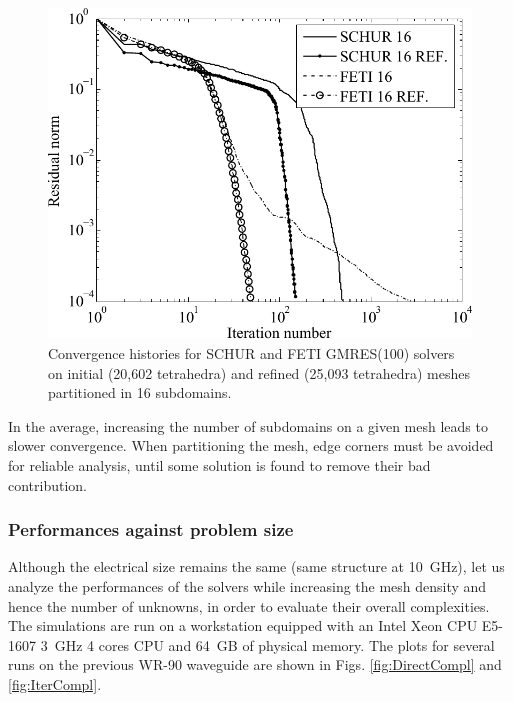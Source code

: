 \begin{figure}[h!]
\centering
\includegraphics[width=13.4cm]{DD16ref}
\caption{Convergence histories for SCHUR and FETI GMRES(100) solvers on initial (20,602 tetrahedra) and refined (25,093 tetrahedra) meshes partitioned in 16 subdomains.}
\label{fig:DD16ref}
\end{figure}

In the average, increasing the number of subdomains on a given mesh leads to slower convergence. When partitioning the mesh, edge corners must be avoided for reliable analysis, until some solution is found to remove their bad contribution.

\subsubsection{Performances against problem size}

Although the electrical size remains the same (same structure at 10~GHz), let us analyze the performances of the solvers while increasing the mesh density and hence the number of unknowns, in order to evaluate their overall complexities. The simulations are run on a workstation equipped with an Intel Xeon CPU E5-1607 3~GHz 4 cores CPU and 64~GB of physical memory. The plots for several runs on the previous WR-90 waveguide are shown in Figs. \ref{fig:DirectCompl} and \ref{fig:IterCompl}.

